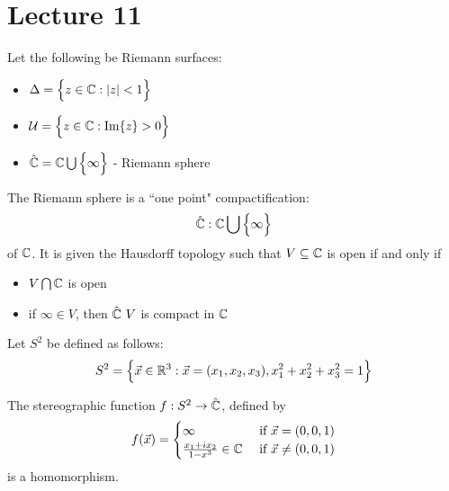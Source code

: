 \documentclass[12pt]{article}
\begin{document}
\section{Lecture 11} 
Let the following be Riemann surfaces: \begin{itemize} 
\item $\Delta = \Big\{ z \in \mathbb{C}: \abs{z} < 1 \Big\}$ 
\item $\mathcal{U} = \Big\{ z \in \mathbb{C}: \Im{z} > 0 \Big\}$ 
\item $\hat{\mathbb{C}} = \mathbb{C} \bigcup \Big\{ \infty \Big\}$ - Riemann sphere \end{itemize} 
The Riemann sphere is a ``one point" compactification: $$ \hat{\mathbb{C}}: \mathbb{C} \bigcup \Big\{ \infty \Big\} $$ of $\mathbb{C}$. It is given the Hausdorff topology such that $V \subseteq \mathbb{C}$ is open if and only if \begin{itemize} 
\item $V \bigcap \mathbb{C}$ is open \item if $\infty \in V$, then $\hat{\mathbb{C}} \ V $ is compact in $\mathbb{C}$ \end{itemize} 
Let $S^2$ be defined as follows: $$ S^2 = \Big\{ \vec{x} \in \mathbb{R}^3: \vec{x} = (x_1,x_2,x_3), x_1^2 + x_2^2 + x_3^2 = 1 \Big\} $$ 
\begin{theorem} The stereographic function $f: S^2 \to \hat{\mathbb{C}}$, defined by 
$$f(\vec{x}) = \begin{cases} \infty &\text{ if } \vec{x} = (0,0,1) \\ \frac{x_1 + ix_2}{1-x^3} \in \mathbb{C} &\text{ if } \vec{x} \neq (0,0,1) \end{cases} $$ is a homomorphism. \end{theorem} 
\end{document}
